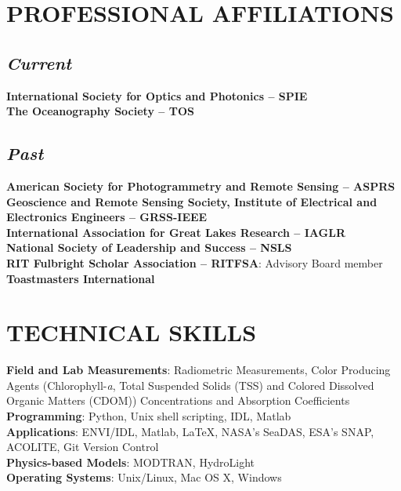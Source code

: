 \documentclass[11pt]{res}
\begin{document}
\begin{resume}
\section{PROFESSIONAL AFFILIATIONS}
\vspace{-0.1in}
\subsection{\it Current}
\vspace{-0.2in}
{\bf International Society for Optics and Photonics -- SPIE}
\vspace{0.1in}\\
{\bf The Oceanography Society -- TOS}
\vspace{-0.2in}
\subsection{\it Past}
\vspace{-0.2in}
{\bf American Society for Photogrammetry and Remote Sensing -- ASPRS}
\vspace{0.1in}\\
{\bf Geoscience and Remote Sensing Society, Institute of Electrical and Electronics Engineers -- GRSS-IEEE}
\vspace{0.1in}\\
{\bf International Association for Great Lakes Research -- IAGLR}
\vspace{0.1in}\\
{\bf National Society of Leadership and Success -- NSLS}
\vspace{0.1in}\\
{\bf RIT Fulbright Scholar Association -- RITFSA}: Advisory Board member
\vspace{0.1in}\\
{\bf Toastmasters International}

\section{TECHNICAL SKILLS}
\vspace{0.1in}
{\bf Field and Lab Measurements}: Radiometric Measurements, Color Producing Agents (Chlorophyll-{\it a}, Total Suspended Solids (TSS) and Colored Dissolved Organic Matters (CDOM)) Concentrations and Absorption Coefficients
\vspace{0.1in}\\
{\bf Programming}: Python, Unix shell scripting, IDL, Matlab
\vspace{0.1in}\\
{\bf Applications}: ENVI/IDL, Matlab, LaTeX, NASA's SeaDAS, ESA's SNAP, ACOLITE, Git Version Control
\vspace{0.1in}\\
{\bf Physics-based Models}: MODTRAN, HydroLight
\vspace{0.1in}\\
{\bf Operating Systems}: Unix/Linux, Mac OS X, Windows\\


\end{resume}
\end{document}
